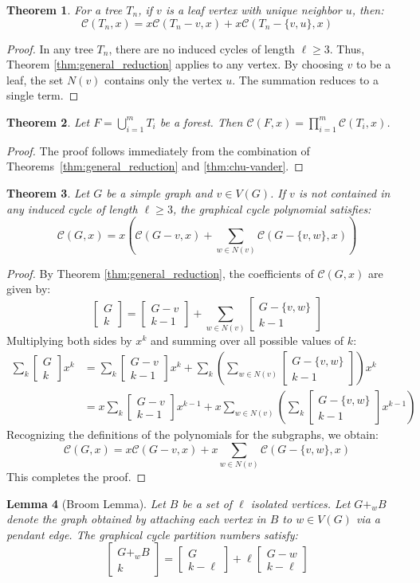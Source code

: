 \documentclass{amsart}
\newtheorem{theorem}{Theorem}[section]
\newtheorem{lemma}[theorem]{Lemma}
\theoremstyle{definition}
\def\st#1#2{\begin{bmatrix} #1 \\ #2 \end{bmatrix}}
\begin{document}
\begin{theorem}
For a tree $T_n$, if $v$ is a leaf vertex with unique neighbor $u$, then:
\begin{equation*}
    \mathcal{C}(T_n, x) = x \mathcal{C}(T_n - v, x) + x \mathcal{C}(T_n - \{v,u\}, x)
\end{equation*}
\end{theorem}
\begin{proof}
In any tree $T_n$, there are no induced cycles of length $\ell \geq 3$. Thus, Theorem \ref{thm:general_reduction} applies to any vertex. By choosing $v$ to be a leaf, the set $N(v)$ contains only the vertex $u$. The summation reduces to a single term.
\end{proof}





\begin{theorem}
Let $F = \bigcup_{i=1}^m T_i$ be a forest. Then $\mathcal{C}(F, x) = \prod_{i=1}^m \mathcal{C}(T_i, x)$.
\end{theorem}
\begin{proof}
The proof follows immediately from the combination of Theorems~\ref{thm:general_reduction} and \ref{thm:chu-vander}.
\end{proof}
\begin{theorem}\label{thm:poly_reduction}
Let $G$ be a simple graph and $v \in V(G)$. If $v$ is not contained in any induced cycle of length $\ell \geq 3$, the graphical cycle polynomial satisfies:
\begin{equation*}
    \mathcal{C}(G, x) = x \left( \mathcal{C}(G-v, x) + \sum_{w \in N(v)} \mathcal{C}(G-\{v,w\}, x) \right)
\end{equation*}
\end{theorem}

\begin{proof}
By Theorem \ref{thm:general_reduction}, the coefficients of $\mathcal{C}(G, x)$ are given by:
\[ \st{G}{k} = \st{G - v}{k - 1} + \sum_{w \in N(v)} \st{G - \{v,w\}}{k - 1} \]
Multiplying both sides by $x^k$ and summing over all possible values of $k$:
\begin{align*}
    \sum_k \st{G}{k} x^k &= \sum_k \st{G - v}{k - 1} x^k + \sum_k \left( \sum_{w \in N(v)} \st{G - \{v,w\}}{k - 1} \right) x^k \\
    &= x \sum_k \st{G - v}{k - 1} x^{k-1} + x \sum_{w \in N(v)} \left( \sum_k \st{G - \{v,w\}}{k - 1} x^{k-1} \right)
\end{align*}
Recognizing the definitions of the polynomials for the subgraphs, we obtain:
\[ \mathcal{C}(G, x) = x \mathcal{C}(G-v, x) + x \sum_{w \in N(v)} \mathcal{C}(G-\{v,w\}, x) \]
This completes the proof.
\end{proof}
	\begin{lemma}[Broom Lemma]\label{broom}
Let $B$ be a set of $\ell$ isolated vertices. Let $G+_w B$ denote the graph obtained by attaching each vertex in $B$ to $w \in V(G)$ via a pendant edge. The graphical cycle partition numbers satisfy:
\begin{equation*}
    \st{G+_w B}{k} = \st{G}{k-\ell} + \ell \st{G-w}{k-\ell}
\end{equation*}
\end{lemma}
\end{document}
